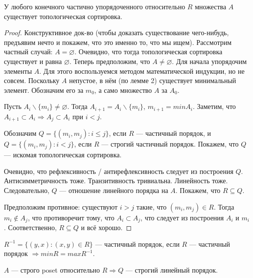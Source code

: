 \begin{theorem}
    У любого конечного частично упорядоченного относительно $R$ множества $A$ существует топологическая сортировка.
\end{theorem}

\begin{proof}
    Конструктивное док-во (чтобы доказать существование чего-нибудь, предъявим нечто и покажем, что это именно то, что мы ищем). Рассмотрим частный случай: $A = \varnothing$. Очевидно, что тогда топологическая сортировка существует и равна $\varnothing$. Теперь предположим, что $A \neq \varnothing$. Для начала упорядочим элементы $A$. Для этого воспользуемся методом математической индукции, но не совсем. Поскольку $A$ непустое, в нём (по лемме 2) существует минимальный элемент. Обозначим его за $m_0$, а само множество $A$ за $A_0$.

    Пусть $A_i \backslash \{m_i\} \neq \varnothing$. Тогда $A_{i + 1} = A_i \backslash \{m_i\}$, $m_{i+1} = min A_i$. Заметим, что $A_{i+1} \subset A_i \Rightarrow A_j \subset A_i$ при $i < j$.

    Обозначим $Q = \{(m_i, m_j) : i \leq j\}$, если $R$ — частичный порядок, и $Q = \{(m_i, m_j) : i < j\}$, если $R$ — строгий частичный порядок. Покажем, что $Q$ — искомая топологическая сортировка.

    Очевидно, что рефлексивность / антирефлексивность следует из построения $Q$. Антисимметричность тоже. Транзитивность тривиальна. Линейность тоже. Следовательно, $Q$ — отношение линейного порядка на $A$. Покажем, что $R \subseteq Q$.

    Предположим противное: существуют $i > j$ такие, что $(m_i, m_j) \in R$. Тогда $m_i \notin A_j$, что противоречит тому, что $A_i \subset A_j$, что следует из построения $A_i$ и $m_i$. Соответственно, $R \subseteq Q$ и всё хорошо.
\end{proof}

\begin{sh-remark}
    $R^{-1} = \{(y, x) : (x, y) \in R\}$ — частичный порядок, если $R$ — частичный порядок $\Rightarrow min R = max R^{-1}$.
\end{sh-remark}

\begin{sh-remark}
    $A$ — строго poset относительно $R \Rightarrow Q$ — строгий линейный порядок.
\end{sh-remark}